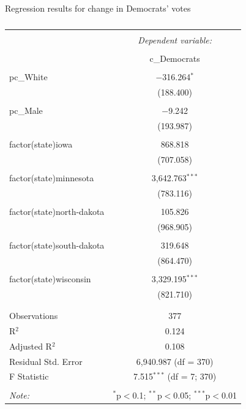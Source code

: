 \documentclass[11pt]{beamer}
\begin{document}
\begin{frame}[shrink=62]{Regression results for change in Democrats' votes}
\begin{table}
  \caption{} 
  \label{Regression 2}
\begin{tabular}{@{\extracolsep{5pt}}lc} 
\\[-1.8ex]\hline 
\hline \\[-1.8ex] 
 & \multicolumn{1}{c}{\textit{Dependent variable:}} \\ 
\cline{2-2} 
\\[-1.8ex] & c\_Democrats \\ 
\hline \\[-1.8ex] 
 pc\_White & $-$316.264$^{*}$ \\ 
  & (188.400) \\ 
  & \\ 
 pc\_Male & $-$9.242 \\ 
  & (193.987) \\ 
  & \\ 
 factor(state)iowa & 868.818 \\ 
  & (707.058) \\ 
  & \\ 
 factor(state)minnesota & 3,642.763$^{***}$ \\ 
  & (783.116) \\ 
  & \\ 
 factor(state)north-dakota & 105.826 \\ 
  & (968.905) \\ 
  & \\ 
 factor(state)south-dakota & 319.648 \\ 
  & (864.470) \\ 
  & \\ 
 factor(state)wisconsin & 3,329.195$^{***}$ \\ 
  & (821.710) \\ 
  & \\ 
\hline \\[-1.8ex] 
Observations & 377 \\ 
R$^{2}$ & 0.124 \\ 
Adjusted R$^{2}$ & 0.108 \\ 
Residual Std. Error & 6,940.987 (df = 370) \\ 
F Statistic & 7.515$^{***}$ (df = 7; 370) \\ 
\hline 
\hline \\[-1.8ex] 
\textit{Note:}  & \multicolumn{1}{r}{$^{*}$p$<$0.1; $^{**}$p$<$0.05; $^{***}$p$<$0.01} \\ 
\end{tabular} 
\end{table} 
\end{frame}
\end{document}
